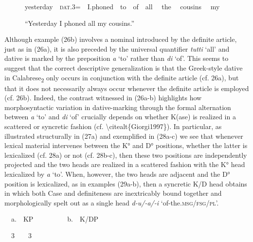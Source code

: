 \documentclass[output=paper,modfonts,nonflat]{langsci/langscibook}
\begin{document}
\begin{styleStandard}
\ \ \ \ \ \ yesterday\ \ \textsc{dat}.3=\ \ I.phoned\ \ to\ \  of\ \ all \ \ the \ \ cousins \ \ my
\end{styleStandard}

\begin{styleStandard}
\ \ \ \ \ \ “Yesterday I phoned all my cousins.”
\end{styleStandard}

\begin{styleStandard}
Although example (26b) involves a nominal introduced by the definite article, just as in (26a), it is also preceded by the universal quantifier \textit{tutti }‘all’ and dative is marked by the preposition \textit{a }‘to’ rather than \textit{di }‘of’. This seems to suggest that the correct descriptive generalization is that the Greek-style dative in Calabrese\textsubscript{2} only occurs in conjunction with the definite article (cf. 26a), but that it does not necessarily always occur whenever the definite article is employed (cf. 26b). Indeed, the contrast witnessed in (26a-b) highlights how morphosyntactic variation in dative-marking through the formal alternation between \textit{a }‘to’ and \textit{di }‘of’ crucially depends on whether K(ase) is realized in a scattered or syncretic fashion (cf. {\textbackslash}citealt\{Giorgi1997\}). In particular, as illustrated structurally in (27a) and exemplified in (28a-c) we see that whenever lexical material intervenes between the K° and D° positions, whether the latter is lexicalized (cf. 28a) or not (cf. 28b-c), then these two positions are independently projected and the two heads are realized in a scattered fashion with the K° head lexicalized by \textit{a }‘to’. When, however, the two heads are adjacent and the D° position is lexicalized, as in examples (29a-b), then a syncretic K/D head obtains in which both Case and definiteness are inextricably bound together and morphologically spelt out as a single head \textit{d-u/-a/-i }‘of-the.\textsc{msg/fsg/pl}’.
\end{styleStandard}

\begin{listWWNumviiileveli}
\item 
\begin{styleListParagraph}
\ \ a.\ \ KP\ \ \ \ \ \ \ \ \ \ b.\ \ K/DP\ \ 
\end{styleListParagraph}
\end{listWWNumviiileveli}
\begin{styleStandard}
\ \ 3\ \ \ \ 3
\end{styleStandard}
\end{document}
